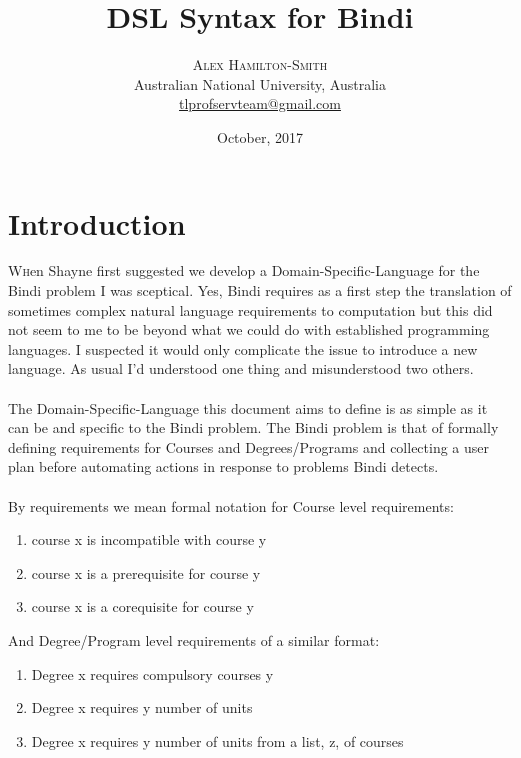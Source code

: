\documentclass[twoside,twocolumn]{article}
\title{DSL Syntax for Bindi} %
\author{%
\textsc{Alex Hamilton-Smith}\\[1ex] %
\normalsize Australian National University, Australia \\ %
\normalsize \href{mailto:tlprofservteam@gmail.com}{tlprofservteam@gmail.com} %
}
\date{October, 2017} %
\begin{document}
\maketitle


\section{Introduction}

\lettrine[nindent=0em,lines=3]{W} hen Shayne first suggested we develop a Domain-Specific-Language for the Bindi problem I was sceptical. Yes, Bindi requires as a first step the translation of sometimes complex natural language requirements to computation but this did not seem to me to be beyond what we could do with established programming languages. I suspected it would only complicate the issue to introduce a new language. As usual I'd understood one thing and misunderstood two others.
\paragraph*{}
The Domain-Specific-Language this document aims to define is as simple as it can be and specific to the Bindi problem. The Bindi problem is that of formally defining requirements for Courses and Degrees/Programs and collecting a user plan before automating actions in response to problems Bindi detects.
\paragraph*{}
By requirements we mean formal notation for Course level requirements:
\begin{enumerate}

\item course x is incompatible with course y
\item course x is a prerequisite for course y
\item course x is a corequisite for course y
\end{enumerate}
And Degree/Program level requirements of a similar format:
\begin{enumerate}
\item Degree x requires compulsory courses y
\item Degree x requires y number of units
\item Degree x requires y number of units from a list, z, of courses
\end{enumerate}
\end{document}
